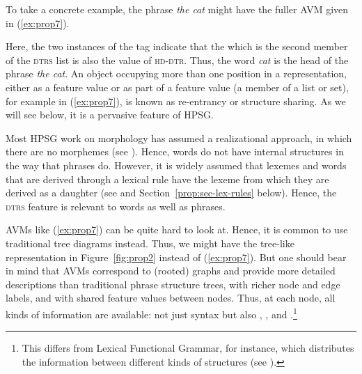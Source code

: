 \documentclass[output=paper
	        ,collection
	        ,collectionchapter
 	        ,biblatex
                ,babelshorthands
                ,newtxmath
                ,draftmode
                ,colorlinks, citecolor=brown
]{langscibook}
\begin{document}
\begin{multicols}{2}
\eal\label{ex:prop6}
\ex\label{ex:prop6a}

\columnbreak
\ex\label{ex:prop6b}
\zl
\end{multicols}
%
To take a concrete example, the phrase \emph{the cat} might have the fuller AVM given in (\ref{ex:prop7}).

\ea\label{ex:prop7}
\z

\noindent
Here, the two instances of the tag  indicate that the  which is the
second member of the \textsc{dtrs} list is also the value of \textsc{hd-dtr}. Thus, the word
\emph{cat} is the head of the phrase \emph{the cat}. An object occupying more than one position in a
representation, either as a feature value or as part of a feature value (a member of a list or set),
for example  in (\ref{ex:prop7}), is known as re-entrancy or structure sharing. As we will
see below, it is a pervasive feature of HPSG. 

Most HPSG work on morphology has assumed a realizational approach, in which there are no morphemes
(see ). Hence, words do not have internal structures in the way that
phrases do. However, it is widely assumed that lexemes and words that are derived through a lexical
rule have the lexeme from which they are derived as a daughter (see \citealt{BC99a,Meurers2001a} and
Section~\ref{prop:sec-lex-rules} below). Hence, the \textsc{dtrs} feature is relevant to words as
well as phrases. 

AVMs like (\ref{ex:prop7}) can be quite hard to look at. Hence, it is common to use traditional tree
diagrams instead. Thus, we might have the tree-like representation in Figure~\ref{fig:prop2} instead
of (\ref{ex:prop7}). But one should bear in mind that AVMs correspond to (rooted) graphs and provide
more detailed descriptions than traditional phrase structure trees, with richer node and edge
labels, and with shared feature values between nodes. Thus, at each node, all kinds of information
are available: not just syntax but also , , and .\footnote{%
 This differs from Lexical Functional Grammar\indexlfg, for instance, which distributes the
 information between different kinds of structures (see ).}
%
\end{document}
